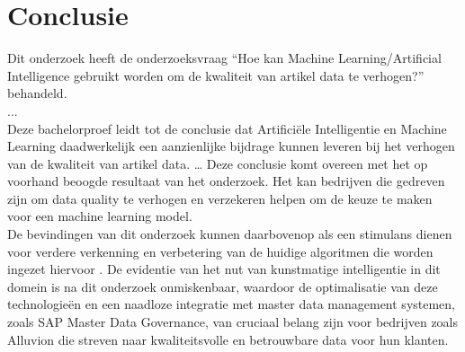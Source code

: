 
\chapter{Conclusie}%
\label{ch:conclusie}


Dit onderzoek heeft de onderzoeksvraag “Hoe kan Machine Learning/Artificial Intelligence gebruikt worden om de kwaliteit van artikel data te verhogen?” behandeld. 
\\
...
\\
Deze bachelorproef leidt tot de conclusie dat Artificiële Intelligentie en Machine Learning daadwerkelijk een aanzienlijke bijdrage kunnen leveren bij het verhogen van de kwaliteit van artikel data. … Deze conclusie komt overeen met het op voorhand beoogde resultaat van het onderzoek. Het kan bedrijven die gedreven zijn om data quality te verhogen en verzekeren helpen om de keuze te maken voor een machine learning model.
\\
De bevindingen van dit onderzoek kunnen daarbovenop als een stimulans dienen voor verdere verkenning en verbetering van de huidige algoritmen die worden ingezet hiervoor . De evidentie van het nut van kunstmatige intelligentie in dit domein is na dit onderzoek onmiskenbaar, waardoor de optimalisatie van deze technologieën en een naadloze integratie met master data management systemen, zoals SAP Master Data Governance, van cruciaal belang zijn voor bedrijven zoals Alluvion die streven naar kwaliteitsvolle en betrouwbare data voor hun klanten. 
